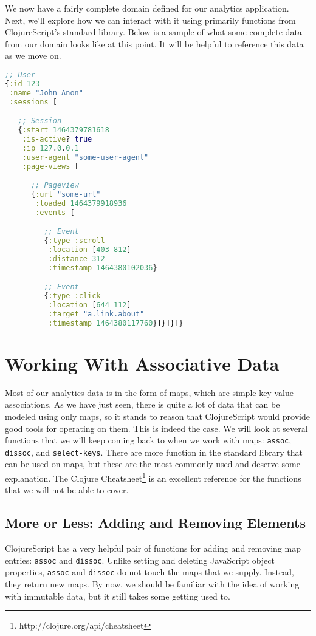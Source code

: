 \documentclass[10pt,twoside,openright]{memoir}
\begin{document}
We now have a fairly complete domain defined for our analytics
application. Next, we'll explore how we can interact with it using
primarily functions from ClojureScript's standard library. Below is a
sample of what some complete data from our domain looks like at this
point. It will be helpful to reference this data as we move on.

\begin{lstlisting}[language=Clojure, caption={Sample data for an analytics domain}]
;; User
{:id 123
 :name "John Anon"
 :sessions [

   ;; Session
   {:start 1464379781618
    :is-active? true
    :ip 127.0.0.1
    :user-agent "some-user-agent"
    :page-views [

      ;; Pageview
      {:url "some-url"
       :loaded 1464379918936
       :events [

         ;; Event
         {:type :scroll
          :location [403 812]
          :distance 312
          :timestamp 1464380102036}

         ;; Event
         {:type :click
          :location [644 112]
          :target "a.link.about"
          :timestamp 1464380117760}]}]}]}
\end{lstlisting}


\section{Working With Associative Data}

Most of our analytics data is in the form of maps, which are simple
key-value associations. As we have just seen, there is quite a lot of
data that can be modeled using only maps, so it stands to reason that
ClojureScript would provide good tools for operating on them. This is
indeed the case. We will look at several functions that we will keep
coming back to when we work with maps: \texttt{assoc}, \texttt{dissoc},
and \texttt{select-keys}. There are more function in the standard
library that can be used on maps, but these are the most commonly used
and deserve some explanation.
The Clojure Cheatsheet\footnote{http://clojure.org/api/cheatsheet} is an
excellent reference for the functions that we will not be able to cover.

\subsection{More or Less: Adding and Removing Elements}

ClojureScript has a very helpful pair of functions for adding and
removing map entries: \texttt{assoc} and \texttt{dissoc}. Unlike setting
and deleting JavaScript object properties, \texttt{assoc} and
\texttt{dissoc} do not touch the maps that we supply. Instead, they
return new maps. By now, we should be familiar with the idea of working
with immutable data, but it still takes some getting used to.
\end{document}
